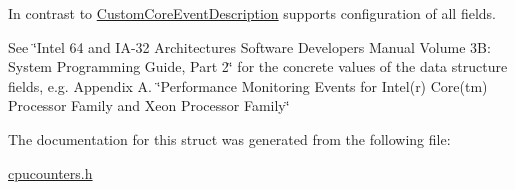 In contrast to \mbox{\hyperlink{struct_p_c_m_1_1_custom_core_event_description}{Custom\+Core\+Event\+Description}} supports configuration of all fields.

See \char`\"{}\+Intel 64 and I\+A-\/32 Architectures Software Developers Manual Volume 3\+B\+:
\+System Programming Guide, Part 2\char`\"{} for the concrete values of the data structure fields, e.\+g. Appendix A. \char`\"{}\+Performance Monitoring Events for Intel(r) Core(tm) Processor Family
and Xeon Processor Family\char`\"{} 

The documentation for this struct was generated from the following file\+:\begin{DoxyCompactItemize}
\item 
\mbox{\hyperlink{cpucounters_8h}{cpucounters.\+h}}\end{DoxyCompactItemize}
